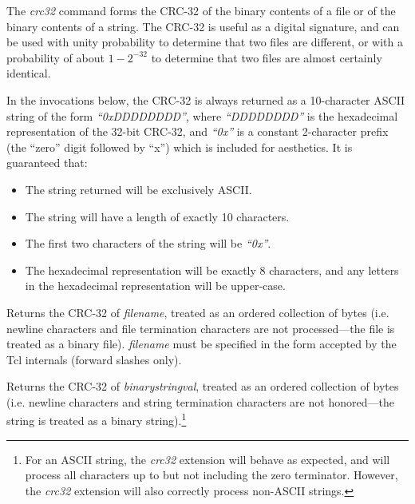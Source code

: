 \begin{tclcommanddescription}
The \emph{crc32} command forms the CRC-32 of the binary contents of a file
or of the binary contents of a string.  The CRC-32 is useful as a digital
signature, and can be used with unity probability to determine that two
files are different, or with a probability of about $1-2^{-32}$ to determine
that two files are almost certainly identical.

In the invocations below, the CRC-32 is always returned as a 10-character ASCII string
of the form \emph{``0xDDDDDDDD''}, where \emph{``DDDDDDDD''} is the hexadecimal representation
of the 32-bit CRC-32, and \emph{``0x''} is a constant 2-character prefix 
(the ``zero'' digit followed by ``x'') which is included for
aesthetics.  It is guaranteed that:

\begin{itemize}
\item The string returned will be exclusively ASCII.
\item The string will have a length of exactly 10 characters.
\item The first two characters of the string will be \emph{``0x''}.
\item The hexadecimal representation
      will be exactly 8 characters, and any letters 
      in the hexadecimal representation will be upper-case.
\end{itemize}

\begin{tclcommandinternaldescription}
Returns the CRC-32 of \emph{filename}, treated as an ordered collection of bytes (i.e.
newline characters and file termination characters are not processed---the file is
treated as a binary file).  \emph{filename} must be specified in the form accepted by
the Tcl internals (forward slashes only).
\end{tclcommandinternaldescription}

\begin{tclcommandinternaldescription}
Returns the CRC-32 of \emph{binarystringval}, treated as an ordered collection of bytes (i.e.
newline characters and string termination characters are not honored---the string is
treated as a binary string).\footnote{For an ASCII string, the \emph{crc32} extension will
behave as expected, and will process all characters up to but not including the zero
terminator.  However, the \emph{crc32} extension will also correctly process non-ASCII strings.}
\end{tclcommandinternaldescription}


\end{tclcommanddescription}
